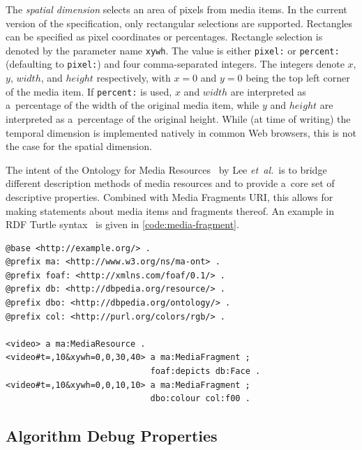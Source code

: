 The \emph{spatial dimension} selects an area of pixels from media items.
In the current version of the specification,
only rectangular selections are supported.
Rectangles can be specified as pixel coordinates or percentages.
Rectangle selection is denoted by the parameter name \texttt{xywh}.
The value is either \texttt{pixel:} or \texttt{percent:}
(defaulting to \texttt{pixel:}) and four comma-separated integers.
The integers denote $x$, $y$, $width$, and $height$ respectively,
with $x = 0$ and $y = 0$ being the top left corner of the media item.
If \texttt{percent:} is used,
$x$ and $width$ are interpreted as a~percentage of the width of the original media item,
while $y$ and $height$ are interpreted as a~percentage of the original height.
While (at time of writing) the temporal dimension is implemented natively
in common Web browsers, this is not the case for the spatial dimension.

The intent of the Ontology for Media Resources~\cite{lee2012mediaontology}
by Lee \emph{et~al.}\ is to bridge different description methods of media resources
and to provide a~core set of descriptive properties.
Combined with Media Fragments URI, this allows for making statements
about media items and fragments thereof.
An example in RDF Turtle syntax~\cite{prudhommeaux2013turtle}
is given in \autoref{code:media-fragment}.

\begin{lstlisting}[caption={[Description of two 10~sec long media fragments]{Description of two 10~sec long media fragments:
  \textit{(i)}~a~tile of dimensions $ 30 \times 40 $ pixels
  starting at pixel coordinates $ (0, 0) $
  that contains a~face; and
  \textit{(ii)}~a~tile of dimensions $ 10 \times 10 $ pixels
  starting at pixel coordinates $ (0, 0) $ of red color}},
  label=code:media-fragment, float=!ht]
@base <http://example.org/> .
@prefix ma: <http://www.w3.org/ns/ma-ont> .
@prefix foaf: <http://xmlns.com/foaf/0.1/> .
@prefix db: <http://dbpedia.org/resource/> .
@prefix dbo: <http://dbpedia.org/ontology/> .
@prefix col: <http://purl.org/colors/rgb/> .

<video> a ma:MediaResource .
<video#t=,10&xywh=0,0,30,40> a ma:MediaFragment ;
                             foaf:depicts db:Face .
<video#t=,10&xywh=0,0,10,10> a ma:MediaFragment ;
                             dbo:colour col:f00 .
\end{lstlisting}

\subsection{Algorithm Debug Properties}
\label{sec:media-item-deduplication-algorithm}

